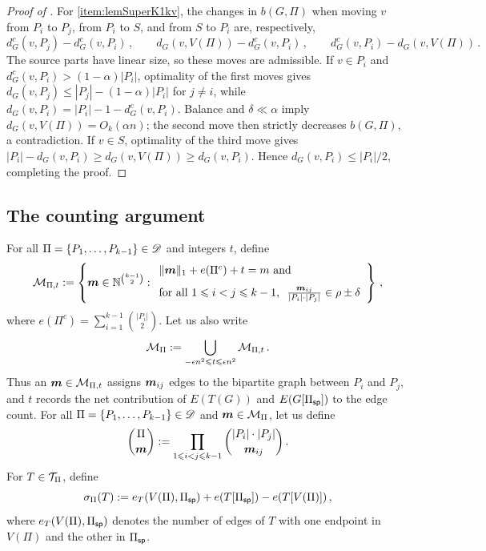 \begin{proof}[Proof of ]
For \ref{item:lemSuperK1kv}, the changes in $b(G,\Pi)$ when moving $v$ from $P_i$ to $P_j$, from $P_i$ to $S$, and from $S$ to $P_i$ are, respectively,
$$d_G^c(v,P_j)-d_G^c(v,P_i)\,,\qquad d_G(v,V(\Pi))-d_G^c(v,P_i)\,,\qquad d_G^c(v,P_i)-d_G(v,V(\Pi))\,.$$
The source parts have linear size, so these moves are admissible. If $v\in P_i$ and $d_G^c(v,P_i)>(1-\alpha)|P_i|$, optimality of the first moves gives $d_G(v,P_j)\leq |P_j|-(1-\alpha)|P_i|$ for $j\neq i$, while $d_G(v,P_i)=|P_i|-1-d_G^c(v,P_i)$. Balance and $\delta\ll\alpha$ imply $d_G(v,V(\Pi))=O_k(\alpha n)$; the second move then strictly decreases $b(G,\Pi)$, a contradiction. If $v\in S$, optimality of the third move gives $|P_i|-d_G(v,P_i)\geq d_G(v,V(\Pi))\geq d_G(v,P_i)$. Hence $d_G(v,P_i)\leq|P_i|/2$, completing the proof.
\end{proof}

\subsection{The counting argument}
For all $\Pi=\{P_1,\dots,P_{k-1}\}\in{\mathscr D}$ and integers $t$, define
$${\mathcal M}_{\Pi,t}:=
\left\{\boldsymbol{m}\in{\mathbb N}^{\binom{k-1}{2}}:
\begin{array}{l}
\lVert\boldsymbol{m}\rVert_1+e(\Pi^c)+t=m \text{ and } \\[8pt]
\text{for all $1\leqslant i<j\leqslant k-1$,}~~\frac{\boldsymbol{m}_{ij}}{|P_i|\cdot|P_j|}\in \rho\pm\delta
\end{array}\right\}\,,$$
where $e(\Pi^c)=\sum_{i=1}^{k-1}\binom{|P_i|}{2}$. Let us also write
$${\mathcal M}_\Pi:=\bigcup_{-\epsilon n^2\leqslant t\leqslant\epsilon n^2}{\mathcal M}_{\Pi,t}\,.$$
Thus an $\boldsymbol{m}\in{\mathcal M}_{\Pi,t}$ assigns $\boldsymbol{m}_{ij}$ edges to the bipartite graph between $P_i$ and $P_j$, and $t$ records the net contribution of $E(T(G))$ and $E(G[\Pi_{\mathsf{sp}}])$ to the edge count. For all $\Pi=\{P_1,\dots,P_{k-1}\}\in{\mathscr D}$ and $\boldsymbol{m}\in{\mathcal M}_\Pi$, let us define
$$\binom{\Pi}{\boldsymbol{m}}:=\prod_{1\leqslant i<j\leqslant k-1}\binom{|P_i|\cdot|P_j|}{\boldsymbol{m}_{ij}}\,.$$
For $T\in{\mathcal T}_\Pi$, define
$$\sigma_\Pi(T):=e_T(V(\Pi),\Pi_{\mathsf{sp}})+e(T[\Pi_{\mathsf{sp}}])-e(T[V(\Pi)])\,,$$
where $e_T(V(\Pi),\Pi_{\mathsf{sp}})$ denotes the number of edges of $T$ with one endpoint in $V(\Pi)$ and the other in $\Pi_{\mathsf{sp}}$.

